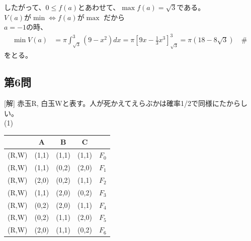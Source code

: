 \documentclass[../main.tex]{subfiles}
\begin{document}
したがって、$0 \le f(a)$とあわせて、$\max f(a) = \sqrt{3}$である。$V(a) \text{が}\min \iff f(a) \text{が}\max$ だから\\
$a=-1$の時、
\begin{align*}
  \min V(a) &= \pi \int_{\sqrt{3}}^3 (9-x^2)dx = \pi \left[ 9x - \frac{1}{3}x^3 \right]_{\sqrt{3}}^3 = \pi (18 - 8\sqrt{3}) \quad \text{\#\ \ }
\end{align*}
をとる。

\subsection*{第6問}
[解] 赤玉R, 白玉Wと表す。人が死かえてえらぶかは確率1/2で同様にたからしい。\\
(1)
\begin{center}
  \begin{tabular}{|c|c|c|c|l|}
    \hline
    & A & B & C & \\ \hline
    (R,W) & (1,1) & (1,1) & (1,1) & $F_0$ \\ \hline
    (R,W) & (1,1) & (0,2) & (2,0) & $F_1$ \\ \hline
    (R,W) & (2,0) & (0,2) & (1,1) & $F_2$ \\ \hline
    (R,W) & (1,1) & (2,0) & (0,2) & $F_3$ \\ \hline
    (R,W) & (0,2) & (2,0) & (1,1) & $F_4$ \\ \hline
    (R,W) & (0,2) & (1,1) & (2,0) & $F_5$ \\ \hline
    (R,W) & (2,0) & (1,1) & (0,2) & $F_6$ \\ \hline
  \end{tabular}
\end{center}
\end{document}
